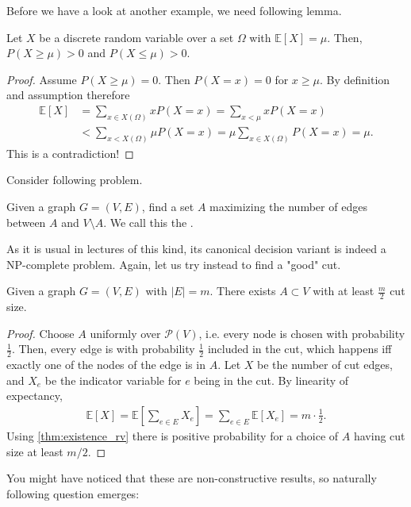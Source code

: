 Before we have a look at another example, we need following lemma.
\begin{lemma}\label{thm:existence_rv}
    Let $X$ be a discrete random variable over a set $\Omega$ with $\mathbb{E}[X]= \mu$.
    Then, $P(X \geq \mu) > 0$ and $P(X \leq \mu) >0$.
\end{lemma}
\begin{proof}
    Assume $P(X \geq \mu) = 0$.
    Then $P(X = x) = 0$ for $x \geq \mu$.
    By definition and assumption therefore
    \begin{align}
        \mathbb{E}[X] & = \sum_{x \in X(\Omega)}x P(X=x) = \sum_{x < \mu}x P(X=x)                   \\
                      & < \sum_{x < X(\Omega)}\mu P(X=x) = \mu \sum_{x \in X(\Omega)} P(X=x) = \mu.
    \end{align}
    This is a contradiction!
\end{proof}
Consider following problem.
\begin{definition}
    Given a graph $G=(V,E)$, find a set $A$ maximizing the number of edges between $A$ and $V \setminus A$.
    We call this the .
\end{definition}
As it is usual in lectures of this kind, its canonical decision variant is indeed a NP-complete problem.
Again, let us try instead to find a "good" cut.
\begin{theorem}
    \label{thm:minmaxcut}
    Given a graph $G = (V,E)$ with $|E|=m$.
    There exists $A \subset V$ with at least $\frac{m}{2}$ cut size.
\end{theorem}
\begin{proof}
    Choose $A$ uniformly over $\mathcal{P}(V)$, i.e. every node is chosen with probability $\frac{1}{2}$.
    Then, every edge is with probability $\frac{1}{2}$ included in the cut,
    which happens iff exactly one of the nodes of the edge is in $A$.
    Let $X$ be the number of cut edges, and $X_e$ be the indicator variable for $e$ being in the cut.
    By linearity of expectancy,
    \begin{align}
        \mathbb{E}[X]=\mathbb{E}\left[\sum_{e \in E}X_e\right]=\sum_{e \in E}\mathbb{E}[X_e]=m \cdot \frac{1}{2}.
    \end{align}
    Using \autoref{thm:existence_rv} there is positive probability for a choice of $A$ having cut size at least $m/2$.
\end{proof}
You might have noticed that these are non-constructive results, so naturally following question emerges:
